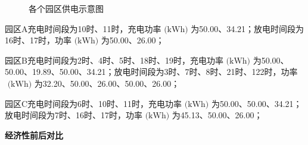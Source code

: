 \documentclass{cumcmthesis}
\begin{document}
\begin{figure}[!h]
\begin{minipage}{.5\textwidth}
\end{minipage}  
\caption{各个园区供电示意图}  
\end{figure} 

园区A充电时间段为10时、11时，充电功率$\text{ (kWh) }$为50.00、34.21；放电时间段为16时、17时，功率$\text{ (kWh) }$为50.00、26.00；

园区B充电时间段为2时、4时、5时、18时、19时，充电功率$\text{ (kWh) }$为50.00、50.00、19.89、50.00、34.21；放电时间段为3时、7时、8时、21时、122时，功率$\text{ (kWh) }$为32.20、50.00、26.00、50.00、26.00；

园区C充电时间段为6时、10时、11时，充电功率$\text{ (kWh) }$为50.00、50.00、34.21；放电时间段为7时、16时、17时，功率$\text{ (kWh) }$为45.13、50.00、26.00；

\newpage

\newpage

\textbf{经济性前后对比} 
\end{document}
